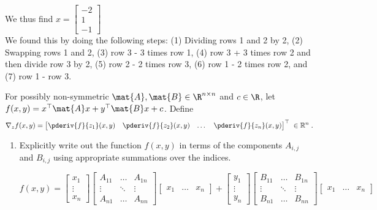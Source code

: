 \documentclass{article}
\begin{document}
\begin{aprob}
\begin{enumerate}
We thus find $ x = \begin{bmatrix} -2 \\ 1 \\ -1 \end{bmatrix} $ \\
We found this by doing the following steps: (1) Dividing rows 1 and 2 by 2, (2) Swapping rows 1 and 2, (3) row 3 - 3 times row 1, (4) row 3 + 3 times row 2 and then divide row 3 by 2, (5) row 2 - 2 times row 3, (6) row 1 - 2 times row 2, and (7) row 1 - row 3.

    \end{enumerate}
\end{aprob}
\noindent\makebox[\linewidth]{\rule{\textwidth}{0.4pt}}
\begin{aprob} \label{prob:sumvec}
    For possibly non-symmetric $\mat{A}, \mat{B} \in \R^{n \times n}$ and $c \in \R$, let $f(x, y) = x^\top \mat{A} x + y^\top \mat{B} x + c$. Define
    $$\nabla_z f(x,y) = \begin{bmatrix}
        \pderiv{f}{z_1}(x,y) & \pderiv{f}{z_2}(x,y) & \dots & \pderiv{f}{z_n}(x,y)
    \end{bmatrix}^\top \; \in{\mathbb R}^{n}\;.$$  
    \begin{enumerate}
    	\item {} Explicitly write out the function $f(x, y)$ in terms of the components $A_{i,j}$ and $B_{i,j}$ using appropriate summations over the indices.
    	
    	$f(x,y) = 
    	\begin{bmatrix} 
    	    x_1 \\ \vdots \\ x_n 
    	\end{bmatrix} 
    	\begin{bmatrix} 
            A_{11} & \dots  & A_{1n}\\
            \vdots & \ddots & \vdots\\
            A_{n1} & \dots  & A_{nn} 
        \end{bmatrix}
        \begin{bmatrix}
            x_1 & \hdots & x_n 
        \end{bmatrix} 
        + 
        \begin{bmatrix} 
    	    y_1 \\ \vdots \\ y_n 
    	\end{bmatrix} 
    	\begin{bmatrix} 
            B_{11} & \dots  & B_{1n}\\
            \vdots & \ddots & \vdots\\
            B_{n1} & \dots  & B_{nn} 
        \end{bmatrix}
        \begin{bmatrix}
            x_1 & \hdots & x_n 
        \end{bmatrix} 
        $
        

\end{enumerate}
\end{aprob}
\end{document}

